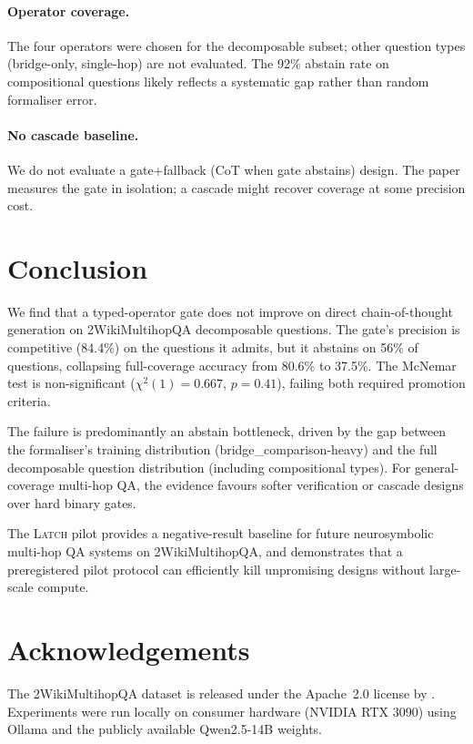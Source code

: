 \documentclass[11pt]{article}
\newcommand{\latch}{\textsc{Latch}}
\newcommand{\mcnem}{McNemar}
\begin{document}
\paragraph{Operator coverage.}  The four operators were chosen for the
decomposable subset; other question types (bridge-only, single-hop) are
not evaluated.  The 92\% abstain rate on compositional questions likely
reflects a systematic gap rather than random formaliser error.

\paragraph{No cascade baseline.}  We do not evaluate a gate+fallback
(CoT when gate abstains) design.  The paper measures the gate in isolation;
a cascade might recover coverage at some precision cost.

\section{Conclusion}
\label{sec:conclusion}

We find that a typed-operator gate does not improve on direct
chain-of-thought generation on 2WikiMultihopQA decomposable questions.
The gate's precision is competitive (84.4\%) on the questions it admits,
but it abstains on 56\% of questions, collapsing full-coverage accuracy
from 80.6\% to 37.5\%.  The \mcnem{} test is non-significant
($\chi^2(1) = 0.667$, $p = 0.41$), failing both required promotion criteria.

The failure is predominantly an abstain bottleneck, driven by the gap
between the formaliser's training distribution (bridge\_comparison-heavy)
and the full decomposable question distribution (including compositional
types).  For general-coverage multi-hop QA, the evidence favours softer
verification or cascade designs over hard binary gates.

The \latch{} pilot provides a negative-result baseline for future
neurosymbolic multi-hop QA systems on 2WikiMultihopQA, and demonstrates
that a preregistered pilot protocol can efficiently kill unpromising
designs without large-scale compute.

\section*{Acknowledgements}

The 2WikiMultihopQA dataset is released under the Apache~2.0 license by
\citet{2wikimultihopqa}.  Experiments were run locally on consumer hardware
(NVIDIA RTX 3090) using Ollama and the publicly available Qwen2.5-14B
weights.



\end{document}
